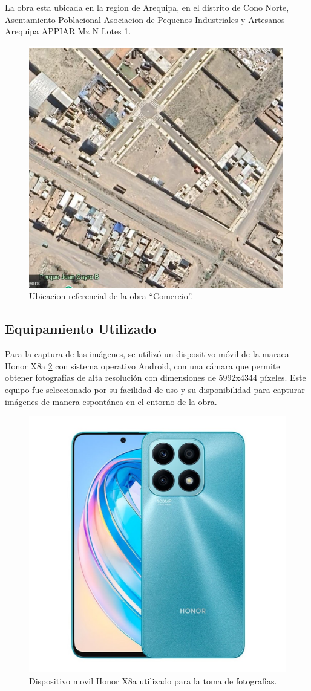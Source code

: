 La obra esta ubicada en la region de Arequipa, en el distrito de Cono Norte, Asentamiento Poblacional Asociacion de Pequenos Industriales y Artesanos Arequipa APPIAR Mz N Lotes 1.

\begin{figure}[!ht]
  \centering
  \includegraphics[width=.49\linewidth]{images/comercio.png}
  \caption{Ubicacion referencial de la obra ``Comercio''.}
  \label{fig:comercio}
\end{figure}

\subsection{Equipamiento Utilizado}

Para la captura de las imágenes, se utilizó un dispositivo móvil de la maraca Honor X8a \ref{fig:honor} con sistema operativo Android, con una cámara que permite obtener fotografías de alta resolución con dimensiones de 5992x4344 píxeles. Este equipo fue seleccionado por su facilidad de uso y su disponibilidad para capturar imágenes de manera espontánea en el entorno de la obra.

\begin{figure}[!ht]
  \centering
  \includegraphics[width=.49\linewidth]{images/honor.jpg}
  \caption{Dispositivo movil Honor X8a utilizado para la toma de fotografias.}
  \label{fig:honor}
\end{figure}

